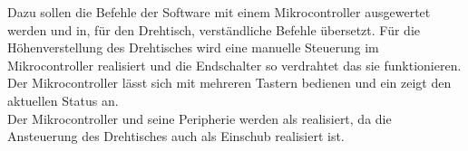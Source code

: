 
Dazu sollen die Befehle der Software mit einem Mikrocontroller ausgewertet werden und in, für den Drehtisch, verständliche Befehle übersetzt.
Für die Höhenverstellung des Drehtisches wird eine manuelle Steuerung im Mikrocontroller realisiert und die Endschalter so verdrahtet das sie funktionieren. \\
Der Mikrocontroller lässt sich mit mehreren Tastern bedienen und ein  zeigt den aktuellen Status an.\\
Der Mikrocontroller und seine Peripherie werden als  realisiert, da die Ansteuerung des Drehtisches auch als Einschub realisiert ist.\\